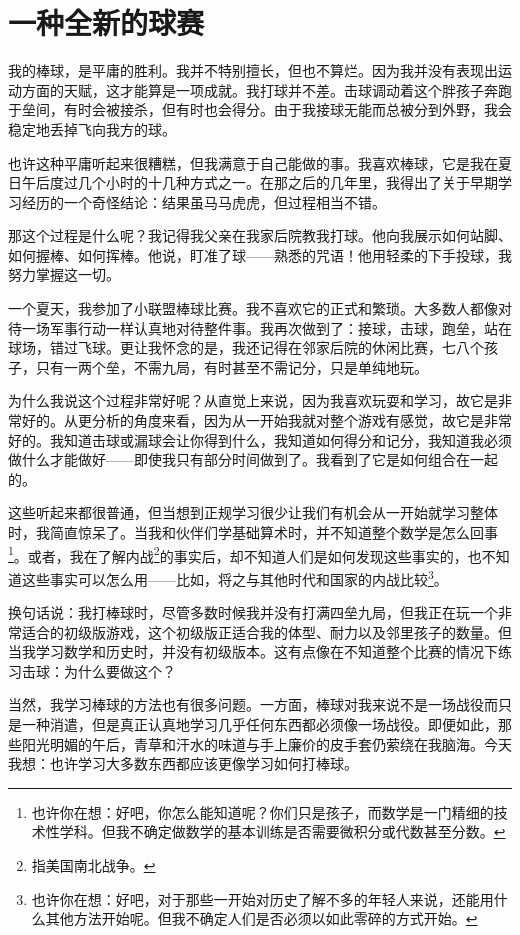 \chapter{一种全新的球赛}
我的棒球，是平庸的胜利。我并不特别擅长，但也不算烂。因为我并没有表现出运动方面的天赋，这才能算是一项成就。我打球并不差。击球调动着这个胖孩子奔跑于垒间，有时会被接杀，但有时也会得分。由于我接球无能而总被分到外野，我会稳定地丢掉飞向我方的球。

也许这种平庸听起来很糟糕，但我满意于自己能做的事。我喜欢棒球，它是我在夏日午后度过几个小时的十几种方式之一。在那之后的几年里，我得出了关于早期学习经历的一个奇怪结论：结果虽马马虎虎，但过程相当不错。

那这个过程是什么呢？我记得我父亲在我家后院教我打球。他向我展示如何站脚、如何握棒、如何挥棒。他说，盯准了球——熟悉的咒语！他用轻柔的下手投球，我努力掌握这一切。

一个夏天，我参加了小联盟棒球比赛。我不喜欢它的正式和繁琐。大多数人都像对待一场军事行动一样认真地对待整件事。我再次做到了：接球，击球，跑垒，站在球场，错过飞球。更让我怀念的是，我还记得在邻家后院的休闲比赛，七八个孩子，只有一两个垒，不需九局，有时甚至不需记分，只是单纯地玩。

为什么我说这个过程非常好呢？从直觉上来说，因为我喜欢玩耍和学习，故它是非常好的。从更分析的角度来看，因为从一开始我就对整个游戏有感觉，故它是非常好的。我知道击球或漏球会让你得到什么，我知道如何得分和记分，我知道我必须做什么才能做好——即使我只有部分时间做到了。我看到了它是如何组合在一起的。

这些听起来都很普通，但当想到正规学习很少让我们有机会从一开始就学习整体时，我简直惊呆了。当我和伙伴们学基础算术时，并不知道整个数学是怎么回事\footnote{也许你在想：好吧，你怎么能知道呢？你们只是孩子，而数学是一门精细的技术性学科。但我不确定做数学的基本训练是否需要微积分或代数甚至分数。}。或者，我在了解内战\footnote{指美国南北战争。}的事实后，却不知道人们是如何发现这些事实的，也不知道这些事实可以怎么用——比如，将之与其他时代和国家的内战比较\footnote{也许你在想：好吧，对于那些一开始对历史了解不多的年轻人来说，还能用什么其他方法开始呢。但我不确定人们是否必须以如此零碎的方式开始。}。

换句话说：我打棒球时，尽管多数时候我并没有打满四垒九局，但我正在玩一个非常适合的初级版游戏，这个初级版正适合我的体型、耐力以及邻里孩子的数量。但当我学习数学和历史时，并没有初级版本。这有点像在不知道整个比赛的情况下练习击球：为什么要做这个？

当然，我学习棒球的方法也有很多问题。一方面，棒球对我来说不是一场战役而只是一种消遣，但是真正认真地学习几乎任何东西都必须像一场战役。即便如此，那些阳光明媚的午后，青草和汗水的味道与手上廉价的皮手套仍萦绕在我脑海。今天我想：也许学习大多数东西都应该更像学习如何打棒球。

